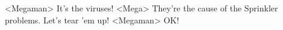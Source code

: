 <Megaman> It's the viruses! 
<Mega> They're the cause of the Sprinkler problems. 
Let's tear 'em up! 
<Megaman> OK! 
